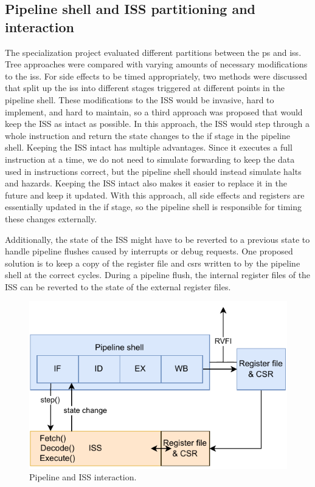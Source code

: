 \subsection{Pipeline shell and ISS partitioning and interaction}
\label{sec:pw_partition}

The specialization project evaluated different partitions between the \gls{ps} and \acrshort{iss}. Tree approaches were compared with varying amounts of necessary modifications to the \acrshort{iss}. For side effects to be timed appropriately, two methods were discussed that split up the \acrshort{iss} into different stages triggered at different points in the pipeline shell. These modifications to the ISS would be invasive, hard to implement, and hard to maintain, so a third approach was proposed that would keep the ISS as intact as possible. In this approach, the ISS would step through a whole instruction and return the state changes to the \acrshort{if} stage in the pipeline shell. Keeping the ISS intact has multiple advantages. Since it executes a full instruction at a time, we do not need to simulate forwarding to keep the data used in instructions correct, but the pipeline shell should instead simulate halts and hazards. Keeping the ISS intact also makes it easier to replace it in the future and keep it updated. With this approach, all side effects and registers are essentially updated in the \acrshort{if} stage, so the pipeline shell is responsible for timing these changes externally.

Additionally, the state of the ISS might have to be reverted to a previous state to handle pipeline flushes caused by interrupts or debug requests. One proposed solution is to keep a copy of the register file and \acrshort{csr}s written to by the pipeline shell at the correct cycles. During a pipeline flush, the internal register files of the ISS can be reverted to the state of the external register files.


\begin{figure}[htb]
    \centering
    \includegraphics[width=0.5\linewidth]{figures/pipeline-iss-3.pdf}
    \caption{Pipeline and ISS interaction.}
    \label{fig:pipeline-iss-3}
\end{figure}

